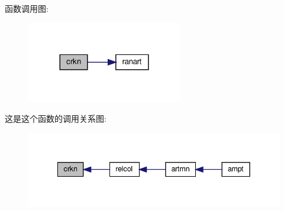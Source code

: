 函数调用图\+:
\nopagebreak
\begin{figure}[H]
\begin{center}
\leavevmode
\includegraphics[width=192pt]{crkn_8f90_a2a085d0bd7b1f3fa3adae02b29936bd7_cgraph}
\end{center}
\end{figure}
这是这个函数的调用关系图\+:
\nopagebreak
\begin{figure}[H]
\begin{center}
\leavevmode
\includegraphics[width=342pt]{crkn_8f90_a2a085d0bd7b1f3fa3adae02b29936bd7_icgraph}
\end{center}
\end{figure}
